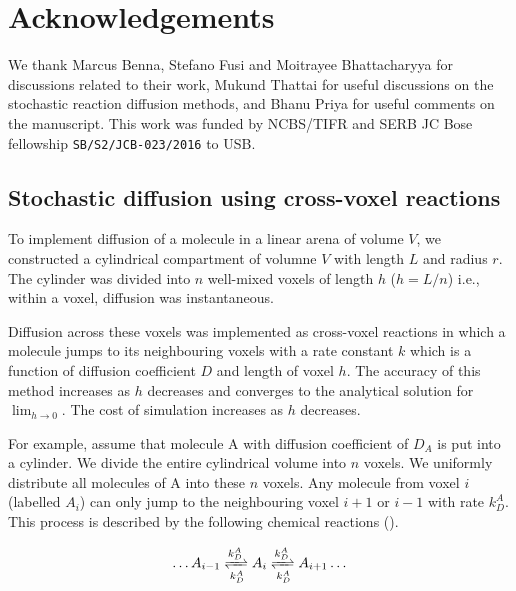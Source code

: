 \documentclass[9pt,lineno,doublespacing]{elife}
\begin{document}
\section{Acknowledgements}
We thank Marcus Benna, Stefano Fusi and Moitrayee Bhattacharyya for
discussions related to their work, Mukund Thattai for useful discussions on the
stochastic reaction diffusion methods, and Bhanu Priya for useful comments on
the manuscript. This work was funded by NCBS/TIFR and SERB JC Bose fellowship
\texttt{SB/S2/JCB-023/2016} to USB.

 

\appendix
\begin{appendixbox}

\subsection*{Stochastic diffusion using cross-voxel reactions}\label{sec:diff_as_gillespie}

To implement diffusion of a molecule in a linear arena of volume $V$, we
constructed a cylindrical compartment of volumne $V$ with length $L$ and radius
$r$. The cylinder was divided into $n$ well-mixed voxels of length $h$
($h=L/n$) i.e., within a voxel, diffusion was instantaneous.

Diffusion across these voxels was implemented as cross-voxel reactions in which
a molecule jumps to its neighbouring voxels with a rate constant $k$
which is a function of diffusion coefficient $D$ and length of voxel $h$. The
accuracy of this method increases as $h$ decreases and converges to the
analytical solution for $\lim_{h \to 0}$. The cost of simulation increases as
$h$ decreases.

For example, assume that molecule A with diffusion coefficient of $D_A$ is put
into a cylinder. We divide the entire cylindrical volume into $n$ voxels. We
uniformly distribute all molecules of A into these $n$ voxels. Any molecule from
voxel $i$ (labelled $A_i$) can only jump to the neighbouring 
voxel $i+1$ or $i-1$
with rate $k_D^A$. This process is described by the following chemical reactions
().

\begin{equation}
\begin{gathered}
    \ldots A_{i-1} \xrightleftharpoons[k_D^A]{k_D^A} A_{i}
    \xrightleftharpoons[k_D^A]{k_D^A} A_{i+1} \ldots
\end{gathered}
\label{eq:stoch_diff}
\end{equation}



\end{appendixbox}
\end{document}
